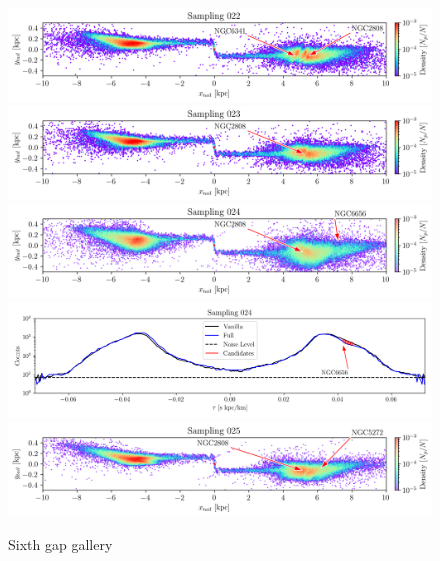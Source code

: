\documentclass{aa}
\begin{document}
\begin{appendix}
    \begin{figure}
      \centering
      \includegraphics[width=\linewidth]{gallery_of_gaps_monte-carlo-022.png}
      \includegraphics[width=\linewidth]{gallery_of_gaps_monte-carlo-023.png}
      \includegraphics[width=\linewidth]{gallery_of_gaps_monte-carlo-024.png}   
      \includegraphics[width=\linewidth]{tau-profile-monte-carlo-024.png}
      \includegraphics[width=\linewidth]{gallery_of_gaps_monte-carlo-025.png}
      \caption{Sixth gap gallery}
      \label{fig:gallery5}
      \end{figure}        


\end{appendix}
\end{document}
